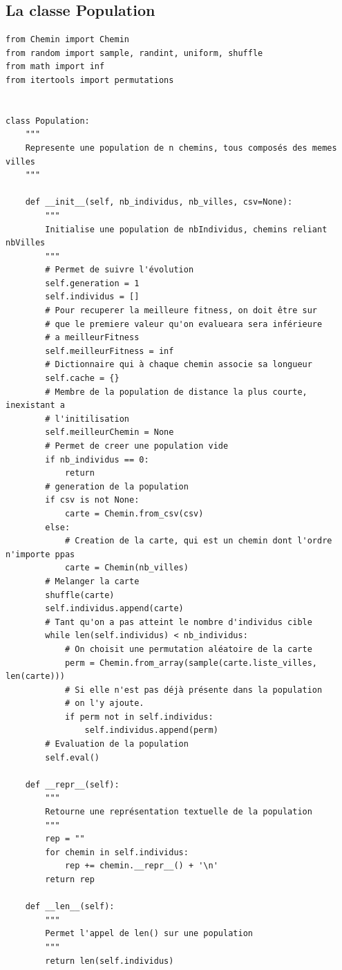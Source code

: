 \documentclass[12pt]{article}
\begin{document}
\subsection*{La classe Population}
\begin{verbatim}
from Chemin import Chemin
from random import sample, randint, uniform, shuffle
from math import inf
from itertools import permutations


class Population:
    """
    Represente une population de n chemins, tous composés des memes villes
    """

    def __init__(self, nb_individus, nb_villes, csv=None):
        """
        Initialise une population de nbIndividus, chemins reliant nbVilles
        """
        # Permet de suivre l'évolution
        self.generation = 1
        self.individus = []
        # Pour recuperer la meilleure fitness, on doit être sur
        # que le premiere valeur qu'on evalueara sera inférieure
        # a meilleurFitness
        self.meilleurFitness = inf
        # Dictionnaire qui à chaque chemin associe sa longueur
        self.cache = {}
        # Membre de la population de distance la plus courte, inexistant a
        # l'initilisation
        self.meilleurChemin = None
        # Permet de creer une population vide
        if nb_individus == 0:
            return
        # generation de la population
        if csv is not None:
            carte = Chemin.from_csv(csv)
        else:
            # Creation de la carte, qui est un chemin dont l'ordre n'importe ppas
            carte = Chemin(nb_villes)
        # Melanger la carte
        shuffle(carte)
        self.individus.append(carte)
        # Tant qu'on a pas atteint le nombre d'individus cible
        while len(self.individus) < nb_individus:
            # On choisit une permutation aléatoire de la carte
            perm = Chemin.from_array(sample(carte.liste_villes, len(carte)))
            # Si elle n'est pas déjà présente dans la population
            # on l'y ajoute.
            if perm not in self.individus:
                self.individus.append(perm)
        # Evaluation de la population
        self.eval()

    def __repr__(self):
        """
        Retourne une représentation textuelle de la population
        """
        rep = ""
        for chemin in self.individus:
            rep += chemin.__repr__() + '\n'
        return rep

    def __len__(self):
        """
        Permet l'appel de len() sur une population
        """
        return len(self.individus)


\end{verbatim}
\end{document}
